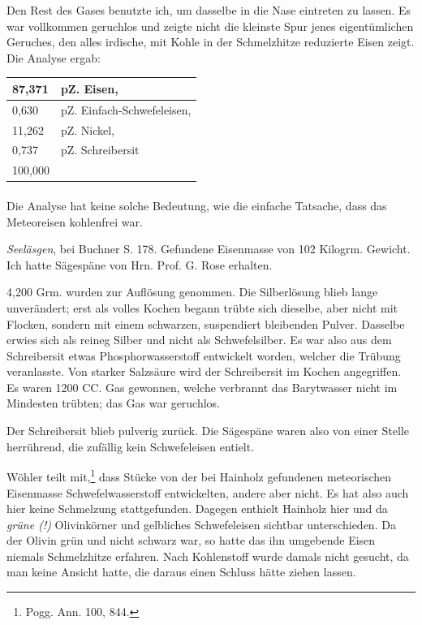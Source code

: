 \documentclass[a4paper, 11pt, oneside, german]{article}
\begin{document}
Den Rest des Gases benutzte ich, um dasselbe in die Nase eintreten zu lassen. Es war vollkommen geruchlos und zeigte nicht die kleinste Spur jenes eigentümlichen Geruches, den alles irdische, mit Kohle in der Schmelzhitze reduzierte Eisen zeigt. Die Analyse ergab:
\begin{table}[H]
    \centering
    \begin{tabular}{|l|l|}
    \hline
        87,371 & pZ. Eisen, \\ \hline
        0,630 & pZ. Einfach-Schwefeleisen, \\ \hline
        11,262 & pZ. Nickel, \\ \hline
        0,737 & pZ. Schreibersit \\ \hline
        100,000 & ~ \\ \hline
    \end{tabular}
\end{table}
\paragraph{}
Die Analyse hat keine solche Bedeutung, wie die einfache Tatsache, dass das Meteoreisen kohlenfrei war.

\emph{Seeläsgen}, bei Buchner S. 178. Gefundene Eisenmasse von 102 Kilogrm. Gewicht. Ich hatte Sägespäne von Hrn. Prof. G. Rose erhalten.

4,200 Grm. wurden zur Auflösung genommen. Die Silberlösung blieb lange unverändert; erst als volles Kochen begann trübte sich dieselbe, aber nicht mit Flocken, sondern mit einem schwarzen, suspendiert bleibenden Pulver. Dasselbe erwies sich als reineg Silber und nicht als Schwefelsilber. Es war also aus dem Schreibersit etwas Phosphorwasserstoff entwickelt worden, welcher die Trübung veranlasste. Von starker Salzsäure wird der Schreibersit im Kochen angegriffen. Es waren 1200 CC. Gas gewonnen, welche verbrannt das Barytwasser nicht im Mindesten trübten; das Gas war geruchlos.

Der Schreibersit blieb pulverig zurück. Die Sägespäne waren also von einer Stelle herrührend, die zufällig kein Schwefeleisen entielt.

Wöhler teilt mit,\footnote{Pogg. Ann. 100, 844.} dass Stücke von der bei Hainholz gefundenen meteorischen Eisenmasse Schwefelwasserstoff entwickelten, andere aber nicht. Es hat also auch hier keine Schmelzung stattgefunden. Dagegen enthielt Hainholz hier und da \emph{grüne (!)} Olivinkörner und gelbliches Schwefeleisen sichtbar unterschieden. Da der Olivin grün und nicht schwarz war, so hatte das ihn umgebende Eisen niemals Schmelzhitze erfahren. Nach Kohlenstoff wurde damals nicht gesucht, da man keine Ansicht hatte, die daraus einen Schluss hätte ziehen lassen.
\end{document}
